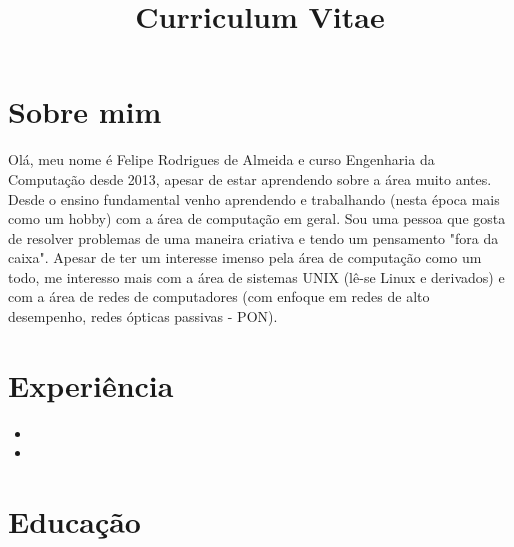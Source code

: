 \documentclass[11pt,a4paper,sans]{moderncv}        %
\title{Curriculum Vitae}                               %
\begin{document}
\makecvtitle

\section{Sobre mim}

\small{Olá, meu nome é Felipe Rodrigues de Almeida e curso Engenharia da Computação desde 2013, apesar de estar aprendendo sobre a área muito antes. Desde o ensino fundamental venho aprendendo e trabalhando (nesta época mais como um hobby) com a área de computação em geral. Sou uma pessoa que gosta de resolver problemas de uma maneira criativa e tendo um pensamento "fora da caixa". Apesar de ter um interesse imenso pela área de computação como um todo, me interesso mais com a área de sistemas UNIX (lê-se Linux e derivados) e com a área de redes de computadores (com enfoque em redes de alto desempenho, redes ópticas passivas - PON).}

\section{Experiência}

\vspace{6pt}

\begin{itemize}

\item{}

\vspace{6pt}

\item{}

\end{itemize}

\section{Educação}
\end{document}
